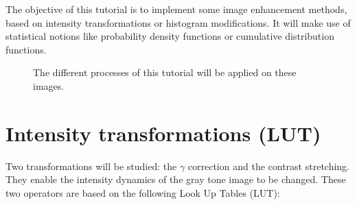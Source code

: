 \def\difficulty{2}
\label{tutorial:image_enhancement}

\begin{note}The objective of this tutorial is to implement some image enhancement methods, based on intensity transformations or histogram modifications. It will make use of statistical notions like probability density functions or cumulative distribution functions.\end{note}

\begin{figure}[H]
\centering\caption{The different processes of this tutorial will be applied on these images.}%
\hfill
{}%
\vspace*{-10pt}%
\label{fig:image_enhancement:enonce:examples}%
\end{figure}

\vspace*{-0.8cm}

\section{Intensity transformations (LUT)}
Two transformations will be studied: the $\gamma$ correction and the contrast stretching. They enable the intensity dynamics of the gray tone image to be changed. These two operators are based on the following Look Up Tables (LUT):

{
	\makeatletter
	\renewcommand\fs@ruled{\def\@fs@cfont{\bfseries}\let\@fs@capt\floatc@ruled
		\def\@fs@pre{\hrule height.8pt depth0pt \kern2pt}%
		\def\@fs@post{\kern2pt\hrule\relax}%
		\def\@fs@mid{\vskip2pt}%
		\let\@fs@iftopcapt\iftrue}
	\makeatother
\begin{figure}[H]
\hfill
{}
\end{figure}}

